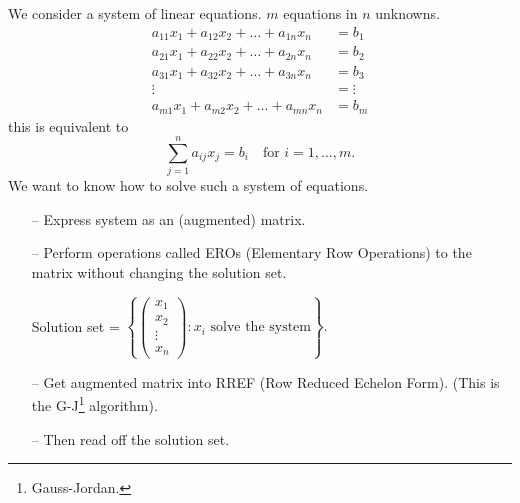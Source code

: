 \documentclass[10pt, a4paper]{article}
\begin{document}
We consider a system of linear equations.
$m$ equations in $n$ unknowns.
\begin{align*}
    a_{1 1}x_1 + a_{1 2}x_2 + \dotsc + a_{1 n}x_n &= b_1 \\
    a_{2 1}x_1 + a_{2 2}x_2 + \dotsc + a_{2 n}x_n &= b_2 \\
    a_{3 1}x_1 + a_{3 2}x_2 + \dotsc + a_{3 n}x_n &= b_3 \\
    \vdots \qquad &= \vdots \\
    a_{m 1}x_1 + a_{m 2}x_2 + \dotsc + a_{m n}x_n &= b_m
\end{align*}
this is equivalent to
\[
\sum_{j = 1}^{n}a_{i j}x_{j} = b_i\quad\text{for } i = 1, \dotsc, m.
\]
We want to know how to solve such a system of equations.
\begin{itemize}
    \item[--] Express system as an (augmented) matrix.
    \item[--] Perform operations called EROs (Elementary Row Operations)
    to the matrix without changing the solution set.

    Solution set = $
    \left\{\begin{pmatrix}
        x_1 \\ x_2 \\ \vdots \\ x_n
    \end{pmatrix} : x_i \text{ solve the system}\right\}. $

    \item[--] Get augmented matrix into RREF (Row Reduced Echelon Form). (This is the G-J\footnote{Gauss-Jordan.} algorithm).
    \item[--] Then read off the solution set.
\end{itemize}
\end{document}
